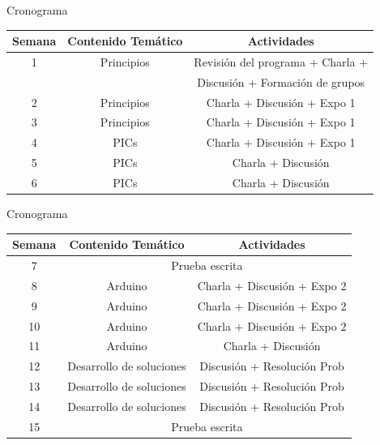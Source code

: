 \documentclass[handout,xcolor=dvipsnames]{beamer}
\begin{document}
\begin{frame}{Cronograma}
 \begin{center}
 {\small
  \begin{tabular}{|c|c|c|}\hline
  
   Semana 	& \multicolumn{1}{c|}{Contenido Temático} & \multicolumn{1}{c|}{Actividades} \\ \hline \hline
   1 		& Principios 		&  Revisión del programa + Charla + \\ 
    		& 	 		&  Discusión + Formación de grupos \\ \hline
   2 		& Principios 		& Charla + Discusión + Expo 1 \\ \hline
   3 		& Principios 		& Charla + Discusión + Expo 1\\ \hline
   4 		& PICs		& Charla + Discusión + Expo 1 \\ \hline
   5		& PICs		& Charla + Discusión  \\ \hline
   6 		& PICs		& Charla + Discusión  \\ \hline

  
  \end{tabular}}
 \end{center}
\end{frame}

\begin{frame}{Cronograma}
 \begin{center}
 {\small
  \begin{tabular}{|c|c|c|}\hline
  
   Semana 	& \multicolumn{1}{c|}{Contenido Temático} & \multicolumn{1}{c|}{Actividades} \\ \hline \hline
   7 		& \multicolumn{2}{c|}{Prueba escrita} \\ \hline
   8 		& Arduino 		& Charla + Discusión + Expo 2 \\ \hline
   9 		& Arduino 		& Charla + Discusión + Expo 2\\ \hline
   10 		& Arduino		& Charla + Discusión + Expo 2 \\ \hline
   11		& Arduino		& Charla + Discusión  \\ \hline
   12 		& Desarrollo de soluciones & Discusión + Resolución Prob \\ \hline
   13 		& Desarrollo de soluciones & Discusión + Resolución Prob \\ \hline
   14		& Desarrollo de soluciones & Discusión + Resolución Prob \\ \hline
   15 		& \multicolumn{2}{c|}{Prueba escrita}  \\ \hline
  \end{tabular}}
 \end{center}
\end{frame}
\end{document}
